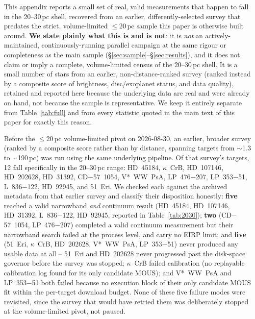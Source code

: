 \documentclass{openjournal}
\begin{document}
This appendix reports a small set of real, valid measurements that
happen to fall in the 20--30\,pc shell, recovered from an earlier,
differently-selected survey that predates the strict, volume-limited
$\leq$20\,pc sample this paper is otherwise built around. \textbf{We
state plainly what this is and is not}: it is \emph{not} an
actively-maintained, continuously-running parallel campaign at the same
rigour or completeness as the main sample (\S\ref{sec:sample}--\S\ref{sec:results}),
and it does not claim or imply a complete, volume-limited census of the
20--30\,pc shell. It is a small number of stars from an earlier,
non-distance-ranked survey (ranked instead by a composite score of
brightness, disc/exoplanet status, and data quality), retained and
reported here because the underlying data are real and were already on
hand, not because the sample is representative. We keep it entirely
separate from Table~\ref{tab:full} and from every statistic quoted in
the main text of this paper for exactly this reason.

Before the $\leq$20\,pc volume-limited pivot on 2026-08-30, an earlier,
broader survey (ranked by a composite score rather than by distance,
spanning targets from $\sim$1.3 to $\sim$190\,pc) was run using the same
underlying pipeline. Of that survey's targets, 12 fall specifically in
the 20--30\,pc range: HD~45184, $\kappa$~CrB, HD~107146, HD~202628,
HD~31392, CD$-$57~1054, V*~WW~PsA, LP~476$-$207, LP~353$-$51,
L~836$-$122, HD~92945, and 51~Eri. We checked each against the archived
metadata from that earlier survey and classify their disposition
honestly: \textbf{five} reached a valid narrowband \emph{and} continuum
result (HD~45184, HD~107146, HD~31392, L~836$-$122, HD~92945, reported
in Table~\ref{tab:2030}); \textbf{two} (CD$-$57~1054, LP~476$-$207)
completed a valid continuum measurement but their narrowband search
failed at the process level, and carry no EIRP limit; and
\textbf{five} (51~Eri, $\kappa$~CrB, HD~202628, V*~WW~PsA, LP~353$-$51)
never produced any usable data at all -- 51~Eri and HD~202628 never
progressed past the disk-space governor before the survey was stopped;
$\kappa$~CrB failed calibration (no replayable calibration log found for
its only candidate MOUS); and V*~WW~PsA and LP~353$-$51 both failed
because no execution block of their only candidate MOUS fit within the
per-target download budget. None of these five failure modes were
revisited, since the survey that would have retried them was
deliberately stopped at the volume-limited pivot, not paused.
\end{document}
